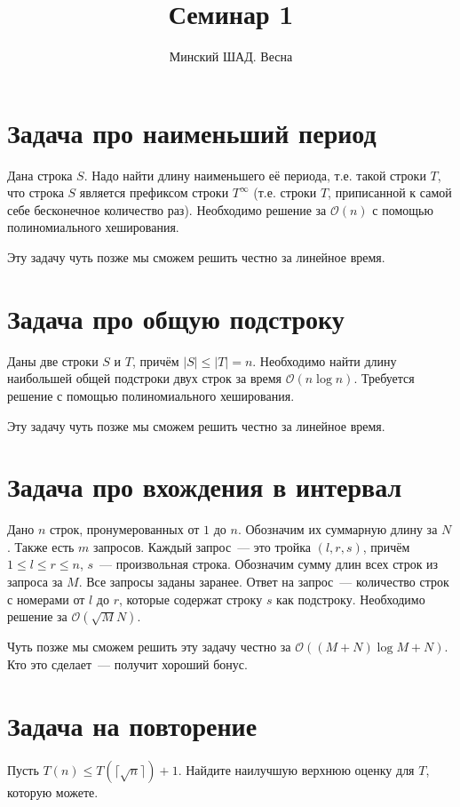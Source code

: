 \documentclass[addpoints]{exam}
\title{Семинар 1}
\author{Минский ШАД. Весна}
\begin{document}
\maketitle

\section{Задача про наименьший период}

Дана строка $S$. Надо найти длину наименьшего её периода, т.е. такой строки $T$, что строка $S$ является префиксом строки $T^{\infty}$ (т.е. строки $T$, приписанной к самой себе бесконечное количество раз). Необходимо решение за $\mathcal{O}(n)$ с помощью полиномиального хеширования. 

Эту задачу чуть позже мы сможем решить честно за линейное время.

\section{Задача про общую подстроку}

Даны две строки $S$ и $T$, причём $|S| \leqslant |T| = n$. Необходимо найти длину наибольшей общей подстроки двух строк за время $\mathcal{O}(n \log{n})$. Требуется решение с помощью полиномиального хеширования. 

Эту задачу чуть позже мы сможем решить честно за линейное время.

\section{Задача про вхождения в интервал}

Дано $n$ строк, пронумерованных от $1$ до $n$. Обозначим их суммарную длину за $N$. Также есть $m$ запросов. Каждый запрос~--- это тройка $(l, r, s)$, причём $1 \leqslant l \leqslant r \leqslant n$, $s$~--- произвольная строка. Обозначим сумму длин всех строк из запроса за $M$. Все запросы заданы заранее. Ответ на запрос~--- количество строк с номерами от $l$ до $r$, которые содержат строку $s$ как подстроку. Необходимо решение за $\mathcal{O}(\sqrt{M} N)$.

Чуть позже мы сможем решить эту задачу честно за $\mathcal{O}((M+N)\log{M+N})$. Кто это сделает~--- получит хороший бонус.

\section{Задача на повторение}

Пусть $T(n) \leqslant T( \lceil \sqrt{n} \rceil ) + 1$. Найдите наилучшую верхнюю оценку для $T$, которую можете.
\end{document}
